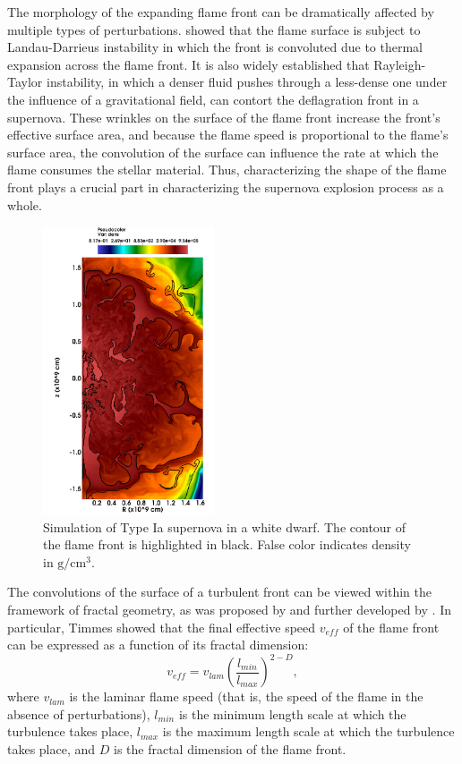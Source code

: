 \documentclass[iop]{emulateapj}
\begin{document}
The morphology of the expanding flame front can be dramatically affected by multiple types of perturbations. \cite{Landau1959} showed that the flame surface is subject to Landau-Darrieus instability in which the front is convoluted due to thermal expansion across the flame front. It is also widely established \citep{Khokhlov} that Rayleigh-Taylor instability, in which a denser fluid pushes through a less-dense one under the influence of a gravitational field, can contort the deflagration front in a supernova. These wrinkles on the surface of the flame front increase the front's effective surface area, and because the flame speed is proportional to the flame's surface area, the convolution of the surface can influence the rate at which the flame consumes the stellar material. Thus, characterizing the shape of the flame front plays a crucial part in characterizing the supernova explosion process as a whole.

\begin{figure}[ht]
	\begin{center}
	\includegraphics[width=0.45\textwidth,clip=true]{Graphics/n7d1r10t15b0011_cropped.png}
	\caption{Simulation of Type Ia supernova in a white dwarf. The contour of the flame front is highlighted in black. False color indicates density in $\mathrm{g/cm^3}$.
	\label{f:flamefrontwithcontour}}
	\end{center}
	\end{figure} 

The convolutions of the surface of a turbulent front can be viewed within the framework of fractal geometry, as was proposed by \cite{Mandelbrot1975} and further developed by \cite{Timmes1994}. In particular, Timmes showed that the final effective speed $v_{eff}$ of the flame front can be expressed as a function of its fractal dimension:
\begin{equation} 
	v_{eff} = v_{lam} \left(\frac{l_{min}}{l_{max}}\right)^{2 - D},
\end{equation}
where $v_{lam}$ is the laminar flame speed (that is, the speed of the flame in the absence of perturbations), $l_{min}$ is the minimum length scale at which the turbulence takes place, $l_{max}$ is the maximum length scale at which the turbulence takes place, and $ D $ is the fractal dimension of the flame front.
\end{document}

